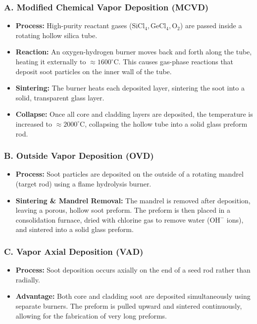 \subsubsection{A. Modified Chemical Vapor Deposition (MCVD)}
\begin{itemize}
  \item   \textbf{Process:} High-purity reactant gases ($\text{SiCl}_4, \text{GeCl}_4, \text{O}_2$) are passed inside a rotating hollow silica tube.
  \item   \textbf{Reaction:} An oxygen-hydrogen burner moves back and forth along the tube, heating it externally to $\approx 1600^\circ\text{C}$. This causes gas-phase reactions that deposit soot particles on the inner wall of the tube.
  \item   \textbf{Sintering:} The burner heats each deposited layer, sintering the soot into a solid, transparent glass layer.
  \item   \textbf{Collapse:} Once all core and cladding layers are deposited, the temperature is increased to $\approx 2000^\circ\text{C}$, collapsing the hollow tube into a solid glass preform rod.
\end{itemize}

\subsubsection{B. Outside Vapor Deposition (OVD)}
\begin{itemize}
  \item   \textbf{Process:} Soot particles are deposited on the outside of a rotating mandrel (target rod) using a flame hydrolysis burner.
  \item   \textbf{Sintering \& Mandrel Removal:} The mandrel is removed after deposition, leaving a porous, hollow soot preform. The preform is then placed in a consolidation furnace, dried with chlorine gas to remove water ($\text{OH}^-$ ions), and sintered into a solid glass preform.
\end{itemize}

\subsubsection{C. Vapor Axial Deposition (VAD)}
\begin{itemize}
  \item   \textbf{Process:} Soot deposition occurs axially on the end of a seed rod rather than radially.
  \item   \textbf{Advantage:} Both core and cladding soot are deposited simultaneously using separate burners. The preform is pulled upward and sintered continuously, allowing for the fabrication of very long preforms.
\end{itemize}

